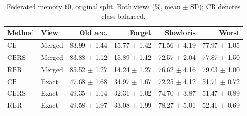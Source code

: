 \begin{table}[t]
\centering
\caption{Federated memory 60, original split. Both views (\%, mean $\pm$ SD); CB denotes class-balanced.}
\label{tab:type}
\footnotesize
\setlength{\tabcolsep}{1.5pt}
\begin{tabular}{llrrrr}
\toprule
Method & View & Old acc. & Forget & Slowloris & Worst\\
\midrule
CB & Merged & 83.99 $\pm$ 1.44 & 15.77 $\pm$ 1.42 & 71.56 $\pm$ 4.19 & 77.97 $\pm$ 1.05\\
CBRS & Merged & 83.88 $\pm$ 1.12 & 15.89 $\pm$ 1.12 & 72.57 $\pm$ 2.04 & 77.87 $\pm$ 1.50\\
RBR & Merged & 85.52 $\pm$ 1.27 & 14.24 $\pm$ 1.27 & 76.62 $\pm$ 4.16 & 79.03 $\pm$ 1.00\\
CB & Exact & 47.68 $\pm$ 1.68 & 34.97 $\pm$ 1.67 & 72.25 $\pm$ 4.12 & 51.71 $\pm$ 0.72\\
CBRS & Exact & 49.35 $\pm$ 1.14 & 32.31 $\pm$ 1.02 & 74.70 $\pm$ 3.87 & 51.47 $\pm$ 0.89\\
RBR & Exact & 49.58 $\pm$ 1.97 & 33.08 $\pm$ 1.99 & 78.27 $\pm$ 5.01 & 52.41 $\pm$ 0.69\\
\bottomrule
\end{tabular}
\end{table}
